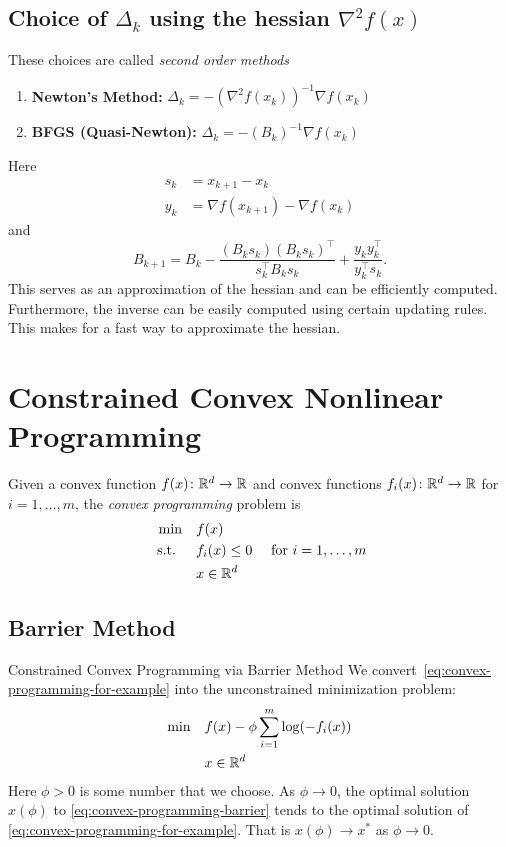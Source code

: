 \subsection{Choice of $\Delta_k$ using the hessian $\nabla^2 f(x)$}
These choices are called \emph{second order methods}
\begin{enumerate}
\item \textbf{Newton's Method:}   $\Delta_k = - (\nabla^2f(x_k))^{-1} \nabla f(x_k)$
\item \textbf{BFGS (Quasi-Newton):} $\Delta_k = - (B_k)^{-1} \nabla f(x_k)$
\end{enumerate}
Here
\begin{align*}
s_k &= x_{k+1} - x_k\\
y_k &= \nabla f(x_{k+1}) - \nabla f(x_k)
\end{align*}
and
$$
B_{k+1} = B_k - \frac{(B_k s_k)(B_k s_k)^\top}{s_k^\top B_k s_k} + \frac{y_k y_k^\top}{y_k^\top s_k}.
$$
This serves as an approximation of the hessian and can be efficiently computed.  Furthermore,  the inverse can be easily computed using certain updating rules.  This makes for a fast way to approximate the hessian.



\section{Constrained Convex Nonlinear Programming}
Given a convex function $f(x)\colon {\mathbb{R}}^d \to {\mathbb{R}}$ and convex functions $f_i(x)\colon {\mathbb{R}}^d \to {\mathbb{R}}$ for $i=1, \dots, m$,  the \emph{convex programming} problem is
\begin{equation}
\label{eq:convex-programming-for-example}
\begin{split}
\min \quad & f(x)\\
\mbox{ s.t. }  \quad & f_i(x) \leq 0  \quad  \mbox{ for } i=1, \dots, m\\
& x \in {\mathbb{R}}^d
\end{split}
\end{equation}

\subsection{Barrier Method}
\begin{general}{Constrained Convex Programming via Barrier Method}{}
We convert~\ref{eq:convex-programming-for-example} into the unconstrained minimization problem:
\begin{equation}
\label{eq:convex-programming-barrier}
\begin{split}
\min \quad & f(x) - \phi \sum_{i=1}^m \log(-f_i(x)) \\
& x \in {\mathbb{R}}^d
\end{split}
\end{equation}
Here $\phi > 0$ is some number that we choose.  As $\phi \to 0$, the optimal solution $x(\phi)$ to \eqref{eq:convex-programming-barrier} tends to the optimal solution of \eqref{eq:convex-programming-for-example}.  That is $x(\phi) \to x^*$ as $\phi \to 0$.
\end{general}

